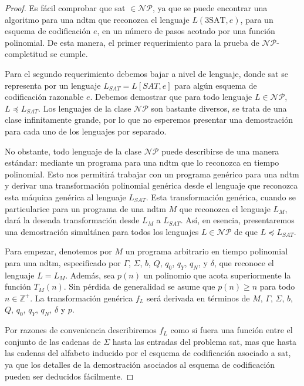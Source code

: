 \documentclass[11pt, a4paper]{memoir}
\begin{document}
\begin{proof}
Es fácil comprobar que \gls{sat}	$\in \mathcal{NP}$, ya que se puede encontrar una algoritmo para una \gls{ndtm} que reconozca el lenguaje $L(\mbox{3SAT},e)$, para un esquema de codificación $e$, en un número de pasos acotado por una función polinomial. De esta manera, el primer requerimiento para la prueba de $\mathcal{NP}$-completitud se cumple. 

Para el segundo requerimiento debemos bajar a nivel de lenguaje, donde \gls{sat} se representa por un lenguaje $L_{SAT}=L[SAT,e]$ para algún esquema de codificación razonable $e$. Debemos demostrar que para todo lenguaje $L\in \mathcal{NP}$, $L \preceq L_{SAT}$. Los lenguajes de la clase $\mathcal{NP}$ son bastante diversos, se trata de una clase infinitamente grande, por lo que no esperemos presentar una demostración para cada uno de los lenguajes por separado.

No obstante, todo lenguaje de la clase $\mathcal{NP}$ puede describirse de una manera estándar: mediante un programa para una \gls{ndtm} que lo reconozca en tiempo polinomial. Esto nos permitirá trabajar con un programa genérico para una \gls{ndtm} y derivar una transformación polinomial genérica desde el lenguaje que reconozca esta máquina genérica al lenguaje $L_{SAT}$. Esta transformación genérica, cuando se particularice para un programa de una \gls{ndtm} $M$ que reconozca el lenguaje $L_M$, dará la deseada transformación desde $L_M$ a $L_{SAT}$. Así, en esencia, presentaremos una demostración simultánea para todos los lenguajes $L\in \mathcal{NP}$ de que $L \preceq L_{SAT}$.

Para empezar, denotemos por $M$ un programa arbitrario en tiempo polinomial para una \gls{ndtm}, especificado por $\Gamma$, $\Sigma$, $b$, $Q$, $q_0$, $q_Y$, $q_N$, y $\delta$, que reconoce el lenguaje $L=L_M$. Además, sea $p(n)$ un polinomio que acota superiormente la función $T_M(n)$. Sin pérdida de generalidad se asume que $p(n)\ge n$ para todo $n\in \mathbb{Z}^+$. La transformación genérica $f_L$ será derivada en términos de $M$, $\Gamma$, $\Sigma$, $b$, $Q$, $q_0$, $q_Y$, $q_N$, $\delta$ y $p$.

Por razones de conveniencia describiremos $f_L$ como si fuera una función entre el conjunto de las cadenas de $\Sigma$ hasta las entradas del problema \gls{sat}, mas que hasta las cadenas del alfabeto inducido por el esquema de codificación asociado a \gls{sat}, ya que los detalles de la demostración asociados al esquema de codificación pueden ser deducidos fácilmente.


\end{proof}
\end{document}
